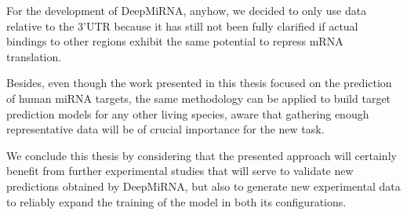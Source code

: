 For the development of DeepMiRNA, anyhow, we decided to only use data relative to the 3'UTR because it has still not been fully clarified if actual bindings to other regions exhibit the same potential to repress mRNA translation. 

Besides, even though the work presented in this thesis focused on the prediction of human miRNA targets, the same methodology can be applied to build target prediction models for any other living species, aware that gathering enough representative data will be of crucial importance for the new task. 

We conclude this thesis by considering that the presented approach will certainly benefit from further experimental studies that will serve to validate new predictions obtained by DeepMiRNA, but also to generate new experimental data to reliably expand the training of the model in both its configurations.
 

  